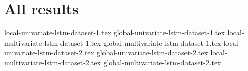
\section{All results}
\label{cha:All results}

{local-univariate-lstm-dataset-1.tex}
{global-univariate-lstm-dataset-1.tex}
{local-multivariate-lstm-dataset-1.tex}
{global-multivariate-lstm-dataset-1.tex}
{local-univariate-lstm-dataset-2.tex}
{global-univariate-lstm-dataset-2.tex}
{local-multivariate-lstm-dataset-2.tex}
{global-multivariate-lstm-dataset-2.tex}